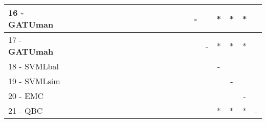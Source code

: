 \begin{table}[h]
\begin{center}
\begin{tabular}{lcc|cc|cc|cc|cc|cc|cc|cc|cc|cc|c}
16 - \textbf{GATUman}	&   &   &   &   &   &   &   &   &   &   &   &   &   &   &   & - &   & * & * & * &   \\ \hline
17 - \textbf{GATUmah}	&   &   &   &   &   &   &   &   &   &   &   &   &   &   &   &   & - & * & * & * &   \\
18 - SVMLbal	&   &   &   &   &   &   &   &   &   &   &   &   &   &   &   &   &   & - &   &   &   \\ \hline
19 - SVMLsim	&   &   &   &   &   &   &   &   &   &   &   &   &   &   &   &   &   &   & - &   &   \\
20 - EMC  	&   &   &   &   &   &   &   &   &   &   &   &   &   &   &   &   &   &   &   & - &   \\ \hline
21 - QBC  	&   &   &   &   &   &   &   &   &   &   &   &   &   &   &   &   &   & * & * & * & - \\\end{tabular}
\label{stratsALCKappaFriedRFwRedux}
\end{center}
\end{table}